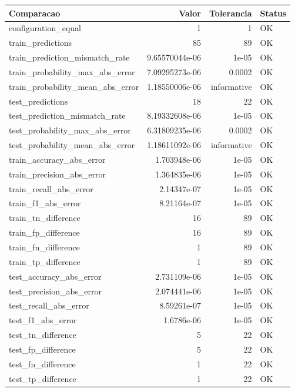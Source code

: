 \begin{tabular}{lrrl}
\hline
Comparacao & Valor & Tolerancia & Status \\
\hline
configuration\_equal & 1 & 1 & OK \\
train\_predictions & 85 & 89 & OK \\
train\_prediction\_mismatch\_rate & 9.65570044e-06 & 1e-05 & OK \\
train\_probability\_max\_abs\_error & 7.09295273e-06 & 0.0002 & OK \\
train\_probability\_mean\_abs\_error & 1.18550006e-06 & informative & OK \\
test\_predictions & 18 & 22 & OK \\
test\_prediction\_mismatch\_rate & 8.19332608e-06 & 1e-05 & OK \\
test\_probability\_max\_abs\_error & 6.31809235e-06 & 0.0002 & OK \\
test\_probability\_mean\_abs\_error & 1.18611092e-06 & informative & OK \\
train\_accuracy\_abs\_error & 1.703948e-06 & 1e-05 & OK \\
train\_precision\_abs\_error & 1.364835e-06 & 1e-05 & OK \\
train\_recall\_abs\_error & 2.14347e-07 & 1e-05 & OK \\
train\_f1\_abs\_error & 8.21164e-07 & 1e-05 & OK \\
train\_tn\_difference & 16 & 89 & OK \\
train\_fp\_difference & 16 & 89 & OK \\
train\_fn\_difference & 1 & 89 & OK \\
train\_tp\_difference & 1 & 89 & OK \\
test\_accuracy\_abs\_error & 2.731109e-06 & 1e-05 & OK \\
test\_precision\_abs\_error & 2.074441e-06 & 1e-05 & OK \\
test\_recall\_abs\_error & 8.59261e-07 & 1e-05 & OK \\
test\_f1\_abs\_error & 1.6786e-06 & 1e-05 & OK \\
test\_tn\_difference & 5 & 22 & OK \\
test\_fp\_difference & 5 & 22 & OK \\
test\_fn\_difference & 1 & 22 & OK \\
test\_tp\_difference & 1 & 22 & OK \\
\hline
\end{tabular}
